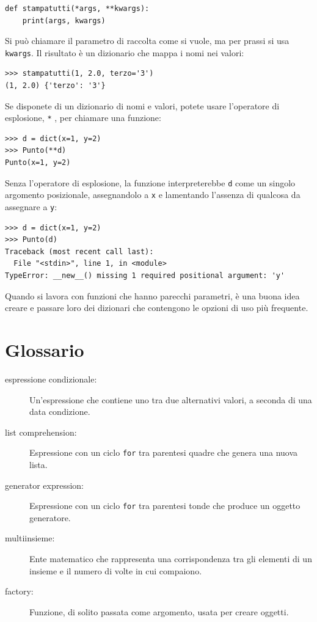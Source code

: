 \documentclass[10pt]{book}
\begin{document}
\begin{verbatim}
def stampatutti(*args, **kwargs):
    print(args, kwargs)
\end{verbatim}
%
Si può chiamare il parametro di raccolta come si vuole, ma per prassi si usa
{\tt kwargs}.  Il risultato è un dizionario che mappa i nomi nei valori:

\begin{verbatim}
>>> stampatutti(1, 2.0, terzo='3')
(1, 2.0) {'terzo': '3'}
\end{verbatim}
%
Se disponete di un dizionario di nomi e valori, potete usare l'operatore di esplosione, {\tt **} , per chiamare una funzione:

\begin{verbatim}
>>> d = dict(x=1, y=2)
>>> Punto(**d)
Punto(x=1, y=2)
\end{verbatim}
%
Senza l'operatore di esplosione, la funzione interpreterebbe {\tt d} come un singolo argomento posizionale, assegnandolo a {\tt x} e lamentando l'assenza di qualcosa da assegnare a {\tt y}:

\begin{verbatim}
>>> d = dict(x=1, y=2)
>>> Punto(d)
Traceback (most recent call last):
  File "<stdin>", line 1, in <module>
TypeError: __new__() missing 1 required positional argument: 'y'
\end{verbatim}
%
Quando si lavora con funzioni che hanno parecchi parametri, è una buona idea creare e passare loro dei dizionari che contengono le opzioni di uso più frequente.


\section{Glossario}

\begin{description}

\item[espressione condizionale:] Un'espressione che contiene uno tra due alternativi valori, a seconda di una data condizione.

\item[list comprehension:] Espressione con un ciclo {\tt for} tra parentesi quadre che genera una nuova lista.

\item[generator expression:] Espressione con un ciclo {\tt for} tra parentesi tonde che produce un oggetto generatore.  

\item[multiinsieme:] Ente matematico che rappresenta una corrispondenza tra gli elementi di un insieme e il numero di volte in cui compaiono. 

\item[factory:] Funzione, di solito passata come argomento, usata per creare oggetti.

\end{description}
\end{document}
